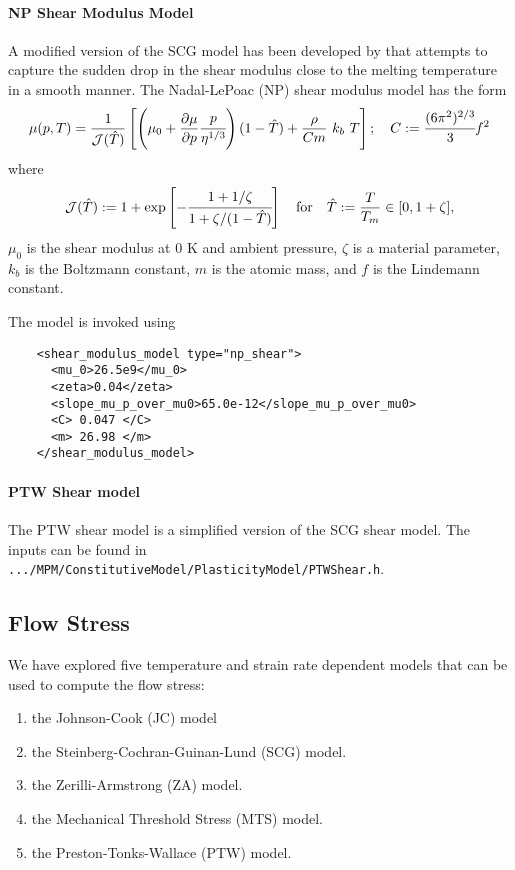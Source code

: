   \paragraph{NP Shear Modulus Model}
  A modified version of the SCG model has been developed by 
  \cite{Nadal2003} that attempts to capture the sudden drop in the
  shear modulus close to the melting temperature in a smooth manner.
  The Nadal-LePoac (NP) shear modulus model has the form
  \begin{equation} \label{eq:NPShear}
    \mu(p,T) = \frac{1}{\mathcal{J}(\hat{T})}
      \left[
        \left(\mu_0 + \frac{\displaystyle\partial \mu}{\displaystyle\partial p} \cfrac{p}{\eta^{1/3}} \right)
        (1 - \hat{T}) + \frac{\rho}{Cm}~k_b~T\right]; \quad
    C := \cfrac{(6\pi^2)^{2/3}}{3} f^2
  \end{equation}
  where
  \begin{equation}
    \mathcal{J}(\hat{T}) := 1 + \exp\left[-\cfrac{1+1/\zeta}
        {1+\zeta/(1-\hat{T})}\right] \quad
       \text{for} \quad \hat{T}:=\frac{T}{T_m}\in[0,1+\zeta],
  \end{equation}
  $\mu_0$ is the shear modulus at 0 K and ambient pressure, $\zeta$ is
  a material parameter, $k_b$ is the Boltzmann constant, $m$ is the atomic
  mass, and $f$ is the Lindemann constant.

  The model is invoked using
  \lstset{language=XML}
  \begin{lstlisting}
    <shear_modulus_model type="np_shear">
      <mu_0>26.5e9</mu_0>
      <zeta>0.04</zeta>
      <slope_mu_p_over_mu0>65.0e-12</slope_mu_p_over_mu0>
      <C> 0.047 </C>
      <m> 26.98 </m>
    </shear_modulus_model>
  \end{lstlisting}
  
  \paragraph{PTW Shear model}
  The PTW shear model is a simplified version of the SCG shear model.
  The inputs can be found in \verb|.../MPM/ConstitutiveModel/PlasticityModel/PTWShear.h|.

  \subsection{Flow Stress}
  We have explored five temperature and strain rate dependent 
  models that can be used to compute the flow stress:
  \begin{enumerate}
    \item the Johnson-Cook (JC) model 
    \item the Steinberg-Cochran-Guinan-Lund (SCG) model. 
    \item the Zerilli-Armstrong (ZA) model.
    \item the Mechanical Threshold Stress (MTS) model. 
    \item the Preston-Tonks-Wallace (PTW) model.
  \end{enumerate}

